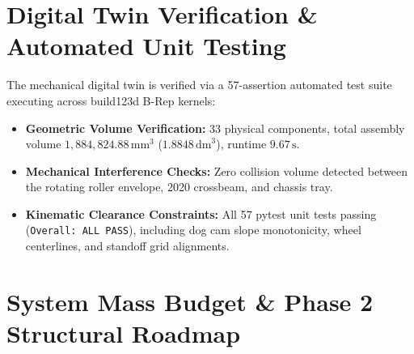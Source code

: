 \documentclass[10pt,a4paper]{article}
\begin{document}
\section{Digital Twin Verification \& Automated Unit Testing}

The mechanical digital twin is verified via a 57-assertion automated test suite executing across build123d B-Rep kernels:
\begin{itemize}[leftmargin=*]
    \item \textbf{Geometric Volume Verification:} 33 physical components, total assembly volume $1,884,824.88\,\text{mm}^3$ ($1.8848\,\text{dm}^3$), runtime $9.67\,\text{s}$.
    \item \textbf{Mechanical Interference Checks:} Zero collision volume detected between the rotating roller envelope, 2020 crossbeam, and chassis tray.
    \item \textbf{Kinematic Clearance Constraints:} All 57 pytest unit tests passing (\texttt{Overall: ALL PASS}), including dog cam slope monotonicity, wheel centerlines, and standoff grid alignments.
\end{itemize}

\section{System Mass Budget \& Phase 2 Structural Roadmap}
\end{document}
